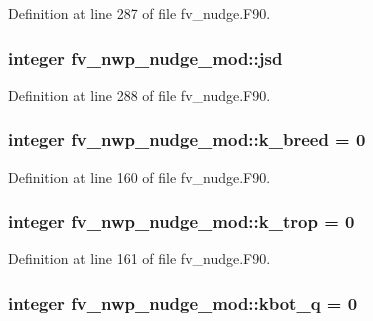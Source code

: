 Definition at line 287 of file fv\-\_\-nudge.\-F90.

\subsubsection[{jsd}]{\setlength{\rightskip}{0pt plus 5cm}integer fv\-\_\-nwp\-\_\-nudge\-\_\-mod\-::jsd\hspace{0.3cm}{\ttfamily [private]}}\label{classfv__nwp__nudge__mod_a14a29353676e857e25063a675a4700d8}


Definition at line 288 of file fv\-\_\-nudge.\-F90.

\subsubsection[{k\-\_\-breed}]{\setlength{\rightskip}{0pt plus 5cm}integer fv\-\_\-nwp\-\_\-nudge\-\_\-mod\-::k\-\_\-breed = 0\hspace{0.3cm}{\ttfamily [private]}}\label{classfv__nwp__nudge__mod_aaf51c10e6d30b78bfd85128c97461593}


Definition at line 160 of file fv\-\_\-nudge.\-F90.

\subsubsection[{k\-\_\-trop}]{\setlength{\rightskip}{0pt plus 5cm}integer fv\-\_\-nwp\-\_\-nudge\-\_\-mod\-::k\-\_\-trop = 0\hspace{0.3cm}{\ttfamily [private]}}\label{classfv__nwp__nudge__mod_adb928bbeb73152d230dd49e24124150b}


Definition at line 161 of file fv\-\_\-nudge.\-F90.

\subsubsection[{kbot\-\_\-q}]{\setlength{\rightskip}{0pt plus 5cm}integer fv\-\_\-nwp\-\_\-nudge\-\_\-mod\-::kbot\-\_\-q = 0\hspace{0.3cm}{\ttfamily [private]}}\label{classfv__nwp__nudge__mod_a74234073b487143a6a2f3fbfb681b78e}


